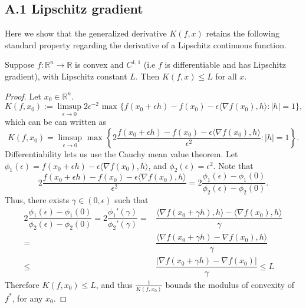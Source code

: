 \documentclass[10pt]{article}
\newenvironment{proposition}[2][Proposition]{\begin{trivlist}
\item[\hskip \labelsep {\bfseries #1}\hskip \labelsep {\bfseries #2.}]}{\end{trivlist}}
\begin{document}
\subsection{A.1 Lipschitz gradient}
Here we show that the generalized derivative $K(f,x)$ retains the following standard property regarding the derivative of a Lipschitz continuous function.
\begin{proposition}{A.1}
Suppose $f:\mathbb{R}^n\rightarrow \mathbb{R}$ is convex and $C^{1,1}$ (i.e $f$ is differentiable and has Lipschitz gradient), with Lipschitz constant $L$. Then $K(f,x)\leq L$ for all $x$. 
\end{proposition}
\begin{proof}
Let $x_0\in \mathbb{R}^n$. $$K(f,x_0) := \limsup_{\epsilon \rightarrow 0} 2\epsilon^{-2} \text{ max } \{ f(x_0 + \epsilon h)  - f(x_0) - \epsilon \langle \nabla f(x_0), h \rangle : |h| =1 \},$$
which can be can written as
$$K(f,x_0)=  \limsup_{\epsilon \rightarrow 0} \text{ max } \left\{ 2 \dfrac{f(x_0 + \epsilon h)  - f(x_0) - \epsilon \langle \nabla f(x_0), h \rangle }{\epsilon^2} : |h|= 1 \right\}.$$
Differentiability lets us use the Cauchy mean value theorem. Let $\phi_1(\epsilon)= f(x_0+\epsilon h) -\epsilon \langle \nabla f(x_0),h\rangle$, and $\phi_2(\epsilon)=\epsilon^2$. Note that 
$$2 \dfrac{f(x_0 + \epsilon h)  - f(x_0) - \epsilon \langle \nabla f(x_0), h \rangle }{\epsilon^2}= 2 \dfrac{\phi_1(\epsilon)- \phi_1(0)}{\phi_2(\epsilon)- \phi_2(0)}.$$
Thus, there exists $\gamma\in (0,\epsilon)$ such that 
\begin{align*}
2 \dfrac{\phi_1(\epsilon)- \phi_1(0)}{\phi_2(\epsilon)- \phi_2(0)} =2 \dfrac{\phi_1'(\gamma)}{\phi_2'(\gamma)} = & \dfrac{\langle\nabla f(x_0+\gamma h),h\rangle - \langle\nabla f(x_0),h\rangle}{\gamma}\\
= & \dfrac{\langle\nabla f(x_0+\gamma h)- \nabla f(x_0) ,h\rangle }{\gamma}\\
\leq & \dfrac{|\nabla f(x_0+\gamma h)- \nabla f(x_0)| }{\gamma} \leq L
\end{align*}
Therefore $K(f,x_0)\leq L$, and thus $\frac{1}{K(f,x_0)}$ bounds the modulus of convexity of $f^*$, for any $x_0$.
\end{proof}
\end{document}
